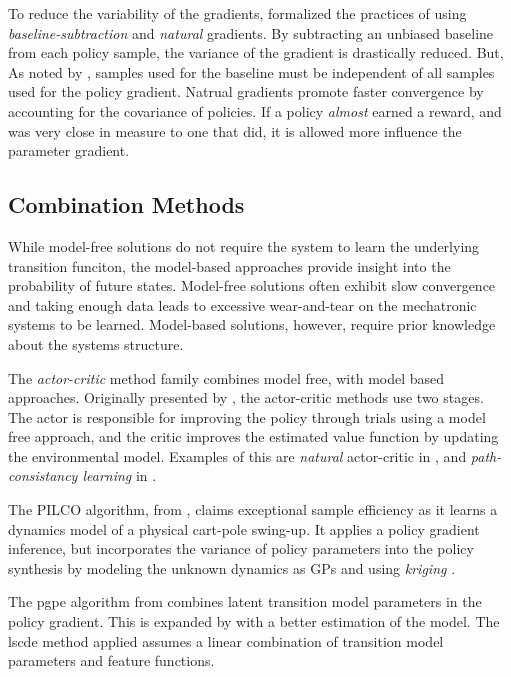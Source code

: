     To reduce the variability of the gradients, \cite{peters2008reinforcement} formalized the practices of using
    \textit{baseline-subtraction} and \textit{natural} gradients. By subtracting an unbiased baseline from each policy
    sample, the variance of the gradient is drastically reduced. But, As noted by \cite{tangkaratt2014model}, samples
    used for the baseline must be independent of all samples used for the policy gradient. Natrual gradients promote
    faster convergence by accounting for the covariance of policies. If a policy \textit{almost} earned a reward, and
    was very close in measure to one that did, it is allowed more influence the parameter gradient.

\subsection{Combination Methods}

    While model-free solutions do not require the system to learn the underlying  transition funciton, the model-based
    approaches provide insight into the probability of future states. Model-free solutions often exhibit slow
    convergence and taking enough data leads to excessive wear-and-tear on the mechatronic systems to be learned.
    Model-based solutions, however, require prior knowledge about the systems structure.

    The \textit{actor-critic} method family combines model free, with model based approaches. Originally presented by
    \cite{konda2000actor}, the actor-critic methods use two stages. The actor is responsible for improving the policy
    through trials using a model free approach, and the critic improves the estimated value function by updating the
    environmental model. Examples of this are \textit{natural} actor-critic in \cite{peters2008reinforcement}, and
    \textit{path-consistancy learning} in \cite{nachum2017bridging}.

    The PILCO algorithm, from \cite{deisenroth2011pilco}, claims exceptional sample efficiency as it learns a dynamics
    model of a physical cart-pole swing-up. It applies a policy gradient inference, but incorporates the variance of
    policy parameters into the policy synthesis by modeling the unknown dynamics as \acp{GP} and using \textit{kriging}
    \cite{rasmussen2004gaussian}.

    The \ac{pgpe} algorithm from \cite{sehnke2010parameter} combines latent transition model parameters in the policy
    gradient. This is expanded by \cite{tangkaratt2014model} with a better estimation of the model. The \ac{lscde}
    method applied assumes a linear combination of transition model parameters and feature functions.

